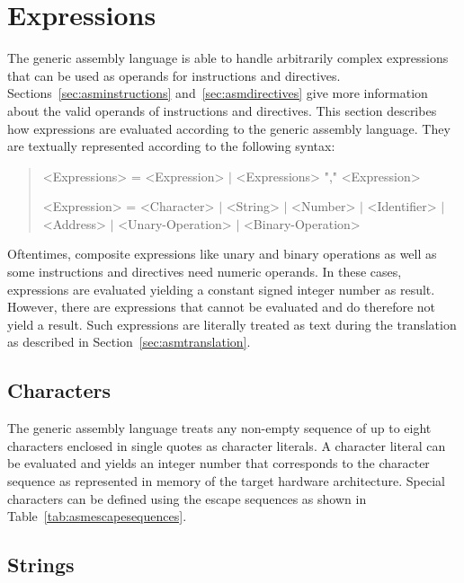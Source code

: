 \section{Expressions}\label{sec:asmexpressions}

The generic assembly language is able to handle arbitrarily complex expressions that can be used as operands for instructions and directives.
Sections~\ref{sec:asminstructions} and~\ref{sec:asmdirectives} give more information about the valid operands of instructions and directives.
This section describes how expressions are evaluated according to the generic assembly language.
They are textually represented according to the following syntax:

\begin{quote}\begin{grammar}
<Expressions> = <Expression> $\mid$ <Expressions> "," <Expression> \par
<Expression> = <Character> $\mid$ <String> $\mid$ <Number> $\mid$ <Identifier> $\mid$ \\ <Address> $\mid$ <Unary-Operation> $\mid$ <Binary-Operation> \par
\end{grammar}\end{quote}

Oftentimes, composite expressions like unary and binary operations as well as some instructions and directives need numeric operands.
In these cases, expressions are evaluated yielding a constant signed integer number as result.
However, there are expressions that cannot be evaluated and do therefore not yield a result.
Such expressions are literally treated as text during the translation as described in Section~\ref{sec:asmtranslation}.

\subsection{Characters}

The generic assembly language treats any non-empty sequence of up to eight characters enclosed in single quotes as character literals.
A character literal can be evaluated and yields an integer number that corresponds to the character sequence as represented in memory of the target hardware architecture.
Special characters can be defined using the escape sequences as shown in Table~\ref{tab:asmescapesequences}.

\subsection{Strings}

